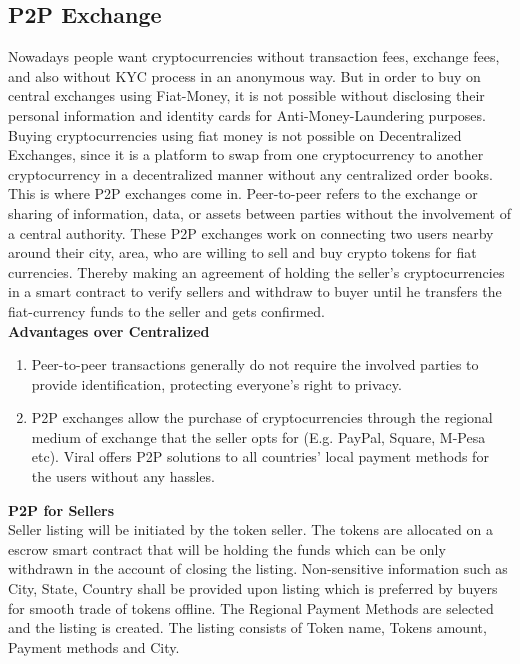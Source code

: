 \documentclass[10pt]{article}
\begin{document}
\newpage

\subsection{P2P Exchange}

Nowadays people want cryptocurrencies without transaction fees, exchange fees, and also without KYC process in an anonymous way. But in order to buy on central exchanges using Fiat-Money, it is not possible without disclosing their personal information and identity cards for Anti-Money-Laundering purposes. Buying cryptocurrencies using fiat money is not possible on Decentralized Exchanges, since it is a platform to swap from one cryptocurrency to another cryptocurrency in a decentralized manner without any centralized order books.\\

This is where P2P exchanges come in. Peer-to-peer refers to the exchange or sharing of information, data, or assets between parties without the involvement of a central authority. These P2P exchanges work on connecting two users nearby around their city, area, who are willing to sell and buy crypto tokens for fiat currencies. Thereby making an agreement of holding the seller's cryptocurrencies in a smart contract to verify sellers and withdraw to buyer until he transfers the fiat-currency funds to the seller and gets confirmed.\\

\textbf{Advantages over Centralized}
\begin{enumerate}[leftmargin=+0.2in]
\item Peer-to-peer transactions generally do not require the involved parties to provide identification,  protecting everyone's right to privacy. 
\item P2P exchanges allow the purchase of cryptocurrencies through the regional medium of exchange that the seller opts for (E.g. PayPal, Square, M-Pesa  etc). Viral offers P2P solutions to all countries' local payment methods for the users without any hassles.
\end{enumerate}

\textbf{P2P for Sellers}\\

Seller listing will be initiated by the token seller. The tokens are allocated on a escrow smart contract that will be holding the funds which can be only withdrawn in the account of closing the listing. Non-sensitive information such as City, State, Country shall be provided upon listing which is preferred by buyers for smooth trade of tokens offline. The Regional Payment Methods are selected and the listing is created. The listing consists of Token name, Tokens amount, Payment methods and City.\\
\end{document}
